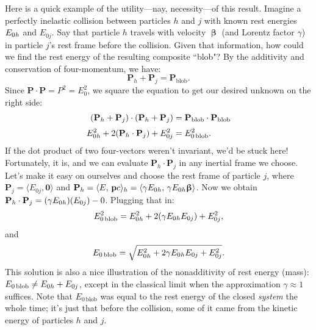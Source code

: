 \documentclass[12pt]{article}
\renewcommand{\vv}[1]{\mathbf{#1}}
\newcommand{\vvbeta}{\bm{\upbeta}}
\begin{document}
Here is a quick example of the utility---nay, necessity---of this result. Imagine a perfectly inelastic collision between particles $h$ and $j$ with known rest energies $E_{0 \mkern.5mu h}$ and $E_{0j}$. Say that particle $h$ travels with velocity $\vvbeta$ (and Lorentz factor $\gamma$) in particle $j$'s rest frame before the collision. Given that information, how could we find the rest energy of the resulting composite ``blob"? By the additivity and conservation of four-momentum, we have:
\begin{equation*}
\vv P_h + \vv P_j = \vv P_{\textrm{blob}}.
\end{equation*}
Since $\vv P \cdot \vv P = P^2 = E_0^2$, we square the equation to get our desired unknown on the right side:
\begin{equation*}
\begin{split}
(\vv P_h + \vv P_j) \cdot (\vv P_h + \vv P_j) &= \vv P_{\textrm{blob}} \cdot \vv P_{\textrm{blob}} \\[2pt]
E_{0 \mkern.5mu h}^2 + 2 (\vv P_h \cdot \vv P_j) + E_{0j}^2 &= E_{0 \, \textrm{blob}}^2.
\end{split}
\end{equation*}
If the dot product of two four-vectors weren't invariant, we'd be stuck here! Fortunately, it is, and we can evaluate $\vv P_h \cdot \vv P_j$ in any inertial frame we choose. Let's make it easy on ourselves and choose the rest frame of particle $j$, where $\vv P_j = \langle E_{0j}, \vv 0 \rangle$ and $\vv P_h = \langle E, \, \vv p c \rangle_h =  \langle \gamma E_{0 \mkern.5mu h}, \, \gamma E_{0 \mkern.5mu h} \vvbeta \rangle$. Now we obtain $\vv P_h \cdot \vv P_j = (\gamma E_{0 \mkern.5mu h})(E_{0j}) - 0$. Plugging that in:
\begin{equation*}
E_{0 \, \textrm{blob}}^2 = E_{0 \mkern.5mu h}^2 + 2 (\gamma E_{0 \mkern.5mu h} E_{0j}) + E_{0j}^2,
\end{equation*}
and
\begin{equation*}
E_{0 \, \textrm{blob}} = \sqrt{E_{0 \mkern.5mu h}^2 + 2 \gamma E_{0 \mkern.5mu h} E_{0j} + E_{0j}^2}.
\end{equation*}
This solution is also a nice illustration of the nonadditivity of rest energy (mass): $E_{0 \, \textrm{blob}} \neq E_{0 \mkern.5mu h} + E_{0j}$, except in the classical limit when the approximation $\gamma \approx 1$ suffices. Note that $E_{0 \, \textrm{blob}}$ was equal to the rest energy of the closed \emph{system} the whole time; it's just that before the collision, some of it came from the kinetic energy of particles $h$ and $j$.
\end{document}
